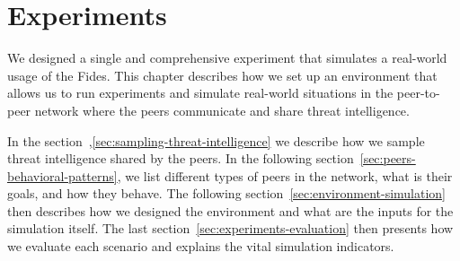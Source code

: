 \chapter{Experiments}
\label{ch:experiments}
We designed a single and comprehensive experiment that simulates a real-world usage of the Fides.
This chapter describes how we set up an environment that allows us to run experiments and simulate real-world situations in the peer-to-peer network where the peers communicate and share threat intelligence.

In the section~,\ref{sec:sampling-threat-intelligence} we describe how we sample threat intelligence shared by the peers.
In the following section~\ref{sec:peers-behavioral-patterns}, we list different types of peers in the network, what is their goals, and how they behave.
The following section~\ref{sec:environment-simulation} then describes how we designed the environment and what are the inputs for the simulation itself.
The last section~\ref{sec:experiments-evaluation} then presents how we evaluate each scenario and explains the vital simulation indicators.







